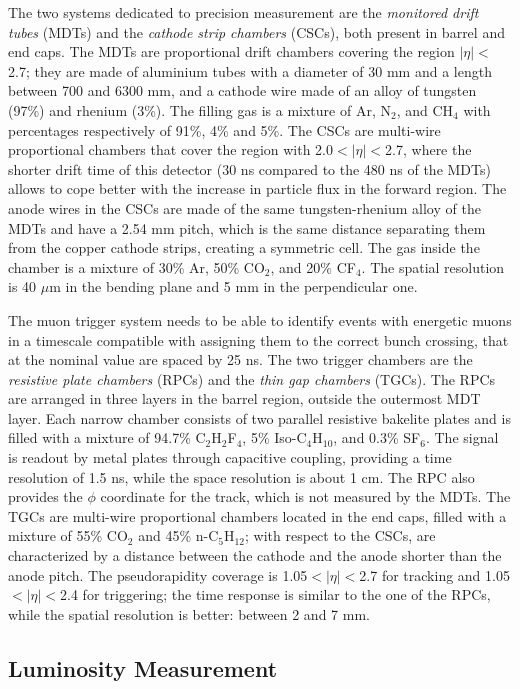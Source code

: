 The two systems dedicated to precision measurement are the \textit{monitored drift tubes} (MDTs)  and the \textit{cathode strip chambers} (CSCs), both present in barrel and end caps. The MDTs are proportional drift chambers covering the region $|\eta|<$2.7; they are made of aluminium tubes with a diameter of 30 mm and a length between 700 and 6300 mm, and a cathode wire made of an alloy of tungsten (97\%) and rhenium (3\%). The filling gas is a mixture of Ar, N$_2$, and CH$_4$ with percentages respectively of 91\%, 4\% and 5\%. The CSCs are multi-wire proportional chambers that cover the region with 2.0$<|\eta|<$2.7, where the shorter drift time of this detector (30 ns compared to the 480 ns of the MDTs) allows to cope better with the increase in particle flux in the forward region. The anode wires in the CSCs are made of the same tungsten-rhenium alloy of the MDTs and have a 2.54 mm pitch, which is the same distance separating them from the copper cathode strips, creating a symmetric cell. The gas inside the chamber is a mixture of 30\% Ar, 50\% CO$_2$, and 20\% CF$_4$. The spatial resolution is 40 $\mu$m in the bending plane and 5 mm in the perpendicular one.

The muon trigger system needs to be able to identify events with energetic muons in a timescale compatible with assigning them to the correct bunch crossing, that at the nominal value are spaced by 25 ns. The two trigger chambers are the \textit{resistive plate chambers} (RPCs) and the \textit{thin gap chambers} (TGCs). The RPCs are arranged in three layers in the barrel region, outside the outermost MDT layer. Each narrow chamber consists of two parallel resistive bakelite plates and is filled with a mixture of 94.7\% C$_2$H$_2$F$_4$, 5\% Iso-C$_4$H$_{10}$, and 0.3\% SF$_6$. The signal is readout by metal plates through capacitive coupling, providing a time resolution of 1.5 ns, while the space resolution is about 1 cm. The RPC also provides the $\phi$ coordinate for the track, which is not measured by the MDTs. The TGCs are multi-wire proportional chambers located in the end caps, filled with a mixture of 55\% CO$_2$ and 45\% n-C$_5$H$_{12}$; with respect to the CSCs, are characterized by a distance between the cathode and the anode shorter than the anode pitch. The pseudorapidity coverage is 1.05$<|\eta|<$2.7 for tracking and 1.05$<|\eta|<$2.4 for triggering; the time response is similar to the one of the RPCs, while the spatial resolution is better: between 2 and 7 mm. 

\subsection{Luminosity Measurement}

